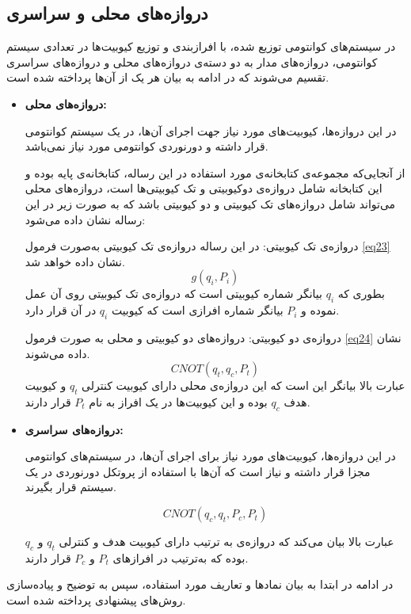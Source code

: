 \subsection{دروازه‌های محلی و سراسری}
در سیستم‌های کوانتومی توزیع شده، با افرازبندی و توزیع کیوبیت‌ها در تعدادی سیستم کوانتومی، دروازه‌های مدار به دو دسته‌ی دروازه‌های محلی و دروازه‌های سراسری تقسیم می‌شوند که در ادامه به بیان هر یک از آن‌ها پرداخته شده است.
\begin{itemize}
\item
\textbf{دروازه‌های محلی:}

در این دروازه‌ها، کیوبیت‌های مورد نیاز جهت اجرای آن‌ها، در یک سیستم کوانتومی قرار داشته و دورنوردی کوانتومی مورد نیاز نمی‌باشد.

از آنجایی‌که مجموعه‌ی کتابخانه‌ی مورد استفاده در این رساله، کتابخانه‌ی پایه بوده و این کتابخانه شامل دروازه‌ی دوکیوبیتی  و تک کیوبیتی‌ها است، دروازه‌های محلی می‌تواند شامل دروازه‌های تک کیوبیتی و دو کیوبیتی باشد که به صورت زیر در این رساله نشان داده می‌شود:


دروازه‌ی تک کیوبیتی: در این رساله دروازه‌ی تک کیوبیتی به‌صورت فرمول \eqref{eq23} نشان داده خواهد شد.
\begin{equation}
g(q_{i},P_{i})
\label{eq23}
\end{equation}
بطوری که $q_{i}$ بیانگر شماره کیوبیتی است که دروازه‌ی تک کیوبیتی روی آن عمل نموده و $P_{i}$ بیانگر شماره افرازی است که کیوبیت $q_{i}$ در آن قرار دارد.



دروازه‌ی دو کیوبیتی: دروازه‌های دو کیوبیتی و محلی به صورت فرمول \eqref{eq24} نشان داده می‌شوند.
\begin{equation}
CNOT(q_{t},q_{c},P_{t})
\label{eq24}
\end{equation}
عبارت بالا بیانگر این است که این دروازه‌ی محلی دارای کیوبیت کنترلی $q_{t}$ و کیوبیت هدف $q_{c}$ بوده و این کیوبیت‌ها در یک افراز به نام $P_{t}$ قرار دارند. 

\item
\textbf{دروازه‌های سراسری:}

در این دروازه‌ها، کیوبیت‌های مورد نیاز برای اجرای آن‌ها، در سیستم‌های کوانتومی مجزا قرار داشته و نیاز است که آن‌ها با استفاده از پروتکل دورنوردی در یک سیستم قرار بگیرند.



\begin{equation}
CNOT(q_{c},q_{t},P_{c},P_{t})
\label{eq25}
\end{equation}

عبارت بالا بیان می‌کند که دروازه‌ی  به ترتیب دارای کیوبیت هدف و کنترلی $q_{t}$ و $q_{c}$ بوده که به‌ترتیب در افراز‌های $P_{t}$ و $P_{c}$ قرار دارند.
\end{itemize}
در ادامه در ابتدا به بیان نمادها و تعاریف مورد استفاده، سپس به توضیح و پیاده‌سازی روش‌های پیشنهادی پرداخته شده است.


